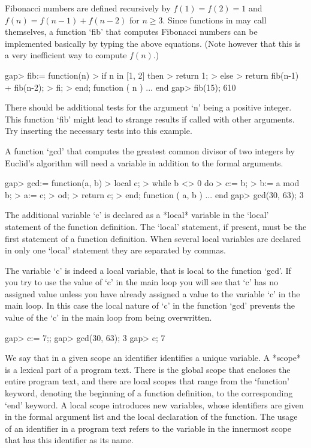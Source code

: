 Fibonacci numbers are defined recursively by $f(1) = f(2) =  1$ and
$f(n) =  f(n-1) + f(n-2)$ for $n \geq 3$.
Since functions in {\GAP} may call themselves,
a function `fib' that computes Fibonacci numbers can be implemented
basically by typing the above equations. (Note however that this is a very
inefficient way to compute $f(n)$.)

\beginexample
gap> fib:= function(n)
>       if n in [1, 2] then
>          return 1;
>       else
>          return fib(n-1) + fib(n-2);
>       fi;
>    end;
function ( n ) ... end
gap> fib(15);
610
\endexample

There should be additional tests for the  argument  `n' being  a positive
integer.   This  function `fib' might  lead to strange  results if called
with other arguments.  Try inserting the necessary tests into this example.


A function `gcd' that computes the greatest common divisor of two
integers by Euclid's algorithm will need a variable in addition to the
formal arguments.

\beginexample
gap> gcd:= function(a, b)
>       local c;
>       while b <> 0 do
>          c:= b;
>          b:= a mod b;
>          a:= c;
>       od;
>       return c;
>    end;
function ( a, b ) ... end
gap> gcd(30, 63);
3
\endexample

The additional  variable `c'  is declared as  a  *local*  variable in the
`local' statement  of the function definition.  The `local' statement, if
present, must  be the first  statement of  a function  definition.   When
several local variables are  declared in only one  `local' statement they
are separated by commas.                                 

The  variable `c'  is  indeed  a local  variable,  that  is local to  the
function `gcd'.  If you try  to use the value of `c' in the main loop you
will see that `c'  has no assigned value unless you have already assigned
a value to the variable `c'  in  the  main loop.  In this case  the local
nature of `c' in the function `gcd' prevents  the value of the `c' in the
main loop from being overwritten.

\beginexample
gap> c:= 7;;
gap> gcd(30, 63);
3
gap> c;
7
\endexample

We say  that in a given scope an identifier identifies a unique variable.
A *scope* is a lexical part of a program text.  There is the global scope
that encloses  the  entire program text, and there are local  scopes that
range from the `function'  keyword, denoting the beginning of  a function
definition, to the corresponding `end' keyword.  A local scope introduces
new  variables, whose identifiers are  given in the formal argument  list
and the local declaration of the function.  The usage of an identifier in
a program text refers to  the  variable in  the  innermost scope that has
this identifier as its name.

